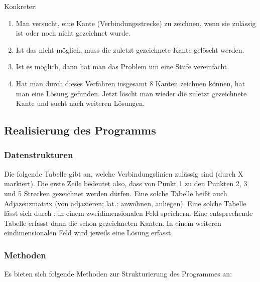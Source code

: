 \documentclass{bschlangaul-aufgabe}
\begin{document}
\noindent
Konkreter:

\begin{enumerate}
\item Man versucht, eine Kante (Verbindungsstrecke) zu zeichnen, wenn
sie zulässig ist oder noch nicht gezeichnet wurde.

\item Ist das nicht möglich, muss die zuletzt gezeichnete Kante gelöscht
werden.

\item  Ist es möglich, dann hat man das Problem um eine Stufe
vereinfacht.

\item  Hat man durch dieses Verfahren insgesamt 8 Kanten zeichnen
können, hat man eine Lösung gefunden. Jetzt löscht man wieder die
zuletzt gezeichnete Kante und sucht nach weiteren Lösungen.
\end{enumerate}

\subsection{Realisierung des Programms}

\subsubsection{Datenstrukturen}

Die folgende Tabelle gibt an, welche Verbindungslinien zulässig sind
(durch X markiert). Die erste Zeile bedeutet also, dass von Punkt 1 zu
den Punkten 2, 3 und 5 Strecken gezeichnet werden dürfen. Eine solche
Tabelle heißt auch Adjazenzmatrix (von adjazieren; lat.: anwohnen,
anliegen). Eine solche Tabelle lässt sich durch ; in einem zweidimensionalen Feld speichern. Eine
entsprechende Tabelle  erfasst dann die
schon gezeichneten Kanten. In einem weiteren eindimensionalen Feld
wird jeweils eine Lösung erfasst.

\subsubsection{Methoden}

Es bieten sich folgende Methoden zur Strukturierung des Programmes an:
\end{document}
